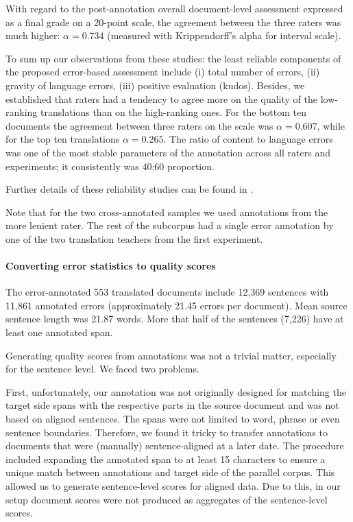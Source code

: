 With regard to the post-annotation overall document-level assessment expressed as a final grade on a 20-point scale, the agreement between the three raters was much higher: $\alpha=0.734$ (measured with Krippendorff's alpha for interval scale).

To sum up our observations from these studies: the least reliable components of the proposed error-based assessment include (i) total number of errors, (ii) gravity of language errors, (iii) positive evaluation (kudos).
Besides, we established that raters had a tendency to agree more on the quality of the low-ranking translations than on the high-ranking ones. For the bottom ten documents the agreement between three raters on the  scale was $\alpha=0.607$, while for the top ten translations $\alpha=0.265$. 
The ratio of content to language errors was one of the most stable parameters of the annotation across all raters and experiments; it consistently was 40:60 proportion.

Further details of these reliability studies can be found in \citet{Kunilovskaya2015far}.

Note that for the two cross-annotated samples we used annotations from the more lenient rater. The rest of the subcorpus had a single error annotation by one of the two translation teachers from the first experiment.

\paragraph{\label{pg:err-score-generation}Converting error statistics to quality scores}
The error-annotated 553 translated documents include 12,369 sentences with 11,861 annotated errors (approximately 21.45 errors per document). Mean source sentence length was 21.87 words. 
More that half of the sentences (7,226) have at least one annotated span.

Generating quality scores from annotations was not a trivial matter, especially for the sentence level. We faced two problems.

First, unfortunately, our annotation was not originally designed for matching the target side spans with the respective parts in the source document and was not based on aligned sentences. The spans were not limited to word, phrase or even sentence boundaries. Therefore, we found it tricky to transfer annotations to documents that were (manually) sentence-aligned at a later date. The procedure included expanding the annotated span to at least 15 characters to ensure a unique match between annotations and target side of the parallel corpus. This allowed us to generate sentence-level scores for aligned data. Due to this, in our setup document scores were not produced as aggregates of the sentence-level scores. 

